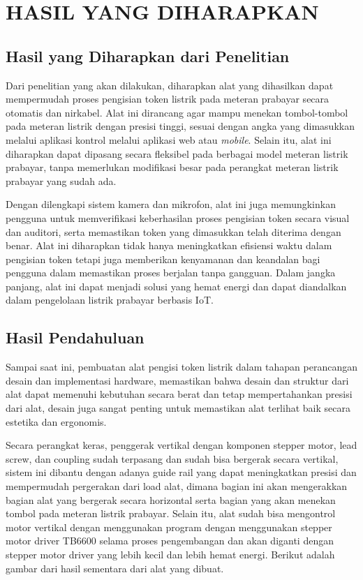 \chapter{HASIL YANG DIHARAPKAN}

\section{Hasil yang Diharapkan dari Penelitian}

Dari penelitian yang akan dilakukan, diharapkan alat yang dihasilkan dapat mempermudah proses pengisian token listrik pada 
meteran prabayar secara otomatis dan nirkabel. Alat ini dirancang agar mampu menekan tombol-tombol pada meteran listrik dengan presisi tinggi, 
sesuai dengan angka yang dimasukkan melalui aplikasi kontrol melalui aplikasi web atau \textit{mobile}. Selain itu, alat ini diharapkan dapat dipasang secara fleksibel pada 
berbagai model meteran listrik prabayar, tanpa memerlukan modifikasi besar pada perangkat meteran listrik prabayar yang sudah ada.

Dengan dilengkapi sistem kamera dan mikrofon, alat ini juga memungkinkan pengguna untuk memverifikasi keberhasilan proses 
pengisian token secara visual dan auditori, serta memastikan token yang dimasukkan telah diterima dengan benar. Alat ini diharapkan 
tidak hanya meningkatkan efisiensi waktu dalam pengisian token tetapi juga memberikan kenyamanan dan keandalan bagi pengguna dalam 
memastikan proses berjalan tanpa gangguan. Dalam jangka panjang, alat ini dapat menjadi solusi yang hemat energi dan dapat diandalkan 
dalam pengelolaan listrik prabayar berbasis IoT.

\section{Hasil Pendahuluan}

Sampai saat ini, pembuatan alat pengisi token listrik dalam tahapan perancangan desain dan implementasi hardware, memastikan bahwa desain dan struktur dari alat
dapat memenuhi kebutuhan secara berat dan tetap mempertahankan presisi dari alat, desain juga sangat penting untuk memastikan alat terlihat baik secara estetika dan ergonomis.

Secara perangkat keras, penggerak vertikal dengan komponen stepper motor, lead screw, dan coupling sudah terpasang dan sudah bisa bergerak secara vertikal,
sistem ini dibantu dengan adanya guide rail yang dapat meningkatkan presisi dan mempermudah pergerakan dari load alat, dimana bagian ini akan mengerakkan
bagian alat yang bergerak secara horizontal serta bagian yang akan menekan tombol pada meteran listrik prabayar.
Selain itu, alat sudah bisa mengontrol motor vertikal dengan menggunakan program dengan menggunakan stepper motor driver TB6600 selama proses pengembangan dan akan diganti dengan stepper motor driver 
yang lebih kecil dan lebih hemat energi. Berikut adalah gambar dari hasil sementara dari alat yang dibuat.

